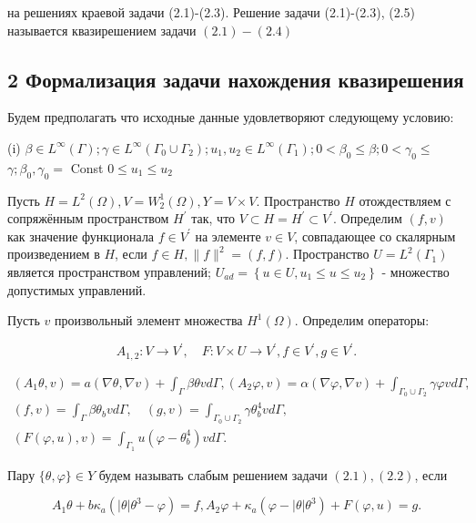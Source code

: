 \documentclass[10pt]{article}
\begin{document}
на решениях краевой задачи (2.1)-(2.3). Решение задачи (2.1)-(2.3), (2.5) называется квазирешением задачи $(2.1)-(2.4)$

\subsection{2 Формализация задачи нахождения квазирешения}
Будем предполагать что исходные данные удовлетворяют следующему условию:

(i) $\beta \in L^{\infty}(\Gamma) ; \gamma \in L^{\infty}\left(\Gamma_{0} \cup \Gamma_{2}\right) ; u_{1}, u_{2} \in L^{\infty}\left(\Gamma_{1}\right) ; 0<\beta_{0} \leqslant \beta ; 0<\gamma_{0} \leqslant$ $\gamma ; \beta_{0}, \gamma_{0}=$ Const $0 \leqslant u_{1} \leqslant u_{2}$

Пусть $H=L^{2}(\Omega), V=W_{2}^{1}(\Omega), Y=V \times V$. Пространство $H$ отождествляем с сопряжённым пространством $H^{\prime}$ так, что $V \subset H=H^{\prime} \subset V^{\prime}$. Определим $(f, v)$ как значение функционала $f \in V^{\prime}$ на элементе $v \in V$, совпадающее со скалярным произведением в $H$, если $f \in H,\|f\|^{2}=(f, f)$. Пространство $U=L^{2}\left(\Gamma_{1}\right)$ является пространством управлений; $U_{a d}=\left\{u \in U, u_{1} \leqslant u \leqslant u_{2}\right\}$ - множество допустимых управлений.

Пусть $v$ произвольный элемент множества $H^{1}(\Omega)$. Определим операторы:

$$
A_{1,2}: V \rightarrow V^{\prime}, \quad F: V \times U \rightarrow V^{\prime}, f \in V^{\prime}, g \in V^{\prime} .
$$

$$
\begin{gathered}
\left(A_{1} \theta, v\right)=a(\nabla \theta, \nabla v)+\int_{\Gamma} \beta \theta v d \Gamma,\left(A_{2} \varphi, v\right)=\alpha(\nabla \varphi, \nabla v)+\int_{\Gamma_{0} \cup \Gamma_{2}} \gamma \varphi v d \Gamma, \\
(f, v)=\int_{\Gamma} \beta \theta_{b} v d \Gamma, \quad(g, v)=\int_{\Gamma_{0} \cup \Gamma_{2}} \gamma \theta_{b}^{4} v d \Gamma, \\
(F(\varphi, u), v)=\int_{\Gamma_{1}} u\left(\varphi-\theta_{b}^{4}\right) v d \Gamma .
\end{gathered}
$$

Пару $\{\theta, \varphi\} \in Y$ будем называть слабым решением задачи $(2.1),(2.2)$, если

$$
A_{1} \theta+b \kappa_{a}\left(|\theta| \theta^{3}-\varphi\right)=f, A_{2} \varphi+\kappa_{a}\left(\varphi-|\theta| \theta^{3}\right)+F(\varphi, u)=g .
$$
\end{document}
